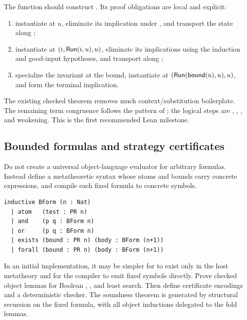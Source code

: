 The function  should construct .  Its proof obligations are local and explicit:

\begin{enumerate}
\item instantiate  at \(u\), eliminate its implication under , and transport the state along ;
\item instantiate  at \((i,\mathsf{Run}(i,u),u)\), eliminate its implications using the induction and good-input hypotheses, and transport along ;
\item specialize the invariant at the bound, instantiate  at \((\mathsf{Run}(\mathsf{bound}(u),u),u)\), and form the terminal implication.
\end{enumerate}

The existing checked  theorem removes much context/substitution boilerplate.  The remaining term congruence follows the pattern of ; the logical steps are , , , and weakening.  This is the first recommended Lean milestone.

\subsection{Bounded formulas and strategy certificates}

Do not create a universal object-language evaluator for arbitrary formulas.  Instead define a metatheoretic syntax whose atoms and bounds carry concrete  expressions, and compile each fixed formula to concrete symbols.

\begin{lstlisting}[language={}] 
inductive BForm (n : Nat)
  | atom   (test : PR n)
  | and    (p q : BForm n)
  | or     (p q : BForm n)
  | exists (bound : PR n) (body : BForm (n+1))
  | forall (bound : PR n) (body : BForm (n+1))
\end{lstlisting}

In an initial implementation, it may be simpler for  to exist only in the host metatheory and for the compiler to emit fixed  symbols directly.  Prove checked object lemmas for Boolean , , and least search.  Then define certificate encodings and a deterministic checker.  The soundness theorem is generated by structural recursion on the fixed formula, with all object inductions delegated to the fold lemmas.

